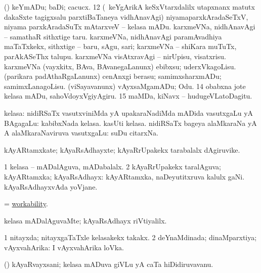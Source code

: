  (\AmA) keYmADu; baDi; cacucx. 
\eanum
\numie
\num{12}  (\kanmu\ keYgArikA keSxVtarxdalilx utapxnanx matutx dakaSxte tagigxsalu parxtiBaTaneya vidhAnavAgi) niyamaparxkAradaSeTxV, niyama parxkAradaSuTx mAtarxveV -- kelasa mADu. 
  
\banum
{} karxmeVNa, nidhAnavAgi -- samathaR sithxtige taru. 
 karxmeVNa, nidhAnavAgi paramAvadhiya maTaTxkekx, sithxtige -- baru, sAgu, sari; karxmeVNa -- shiKara muTuTx, parAkASeThx talupu. 
 karxmeVNa visAtxravAgi -- nirUpisu, visatxrisu. 
 karxmeVNa (vayxkitx, BAva, BAvanegaLanunx) ebibxsu; uderxVkagoLisu. 
 (parikara padAthaRgaLanunx) cenAnxgi berasu; samimxsharxmADu; samimxLanagoLisu. 
 (viSayavanunx) vAyxsaMgamADu; Odu. 
\eanum
\numie
\num{14}  obabxna jote kelasa mADu, sahoVdoyxVgiyAgiru. 
\num{15}  maMDa, kiNavx -- hudugeVLatoDagitu. 
\enum
\emng
\eentry

\bentry
{}
\gl{\saupa}
\expl{}
\bmng
kelasa: 
\banum
{} nidiRSaTx vasutxviniMda yA upakaraNadiMda mADida vasutxgaLu yA BAgagaLu:  kabibxNada kelasa.  kasUti kelasa. 
 nidiRSaTx bageya alaMkaraNa yA A alaMkaraNaviruva vasutxgaLu:  suDu citarxNa. 
\eanum
\emng
\eentry

\bentry
{} 
\gl{\nA}
\bmng
kAyARtamxkate; kAyaRsAdhayxte; kAyaRrUpakekx tarabalalx dAgiruvike. 
\emng
\eentry

\bentry
{} 
\gl{\gu}
\expl{}
\bmng
\bnum
\num{1} kelasa -- mADalAguva, mADabalalx. 
\num{2} kAyaRrUpakekx taralAguva; kAyARtamxka; kAyaRsAdhayx:  kAyARtamxka, naDeyutitxruva kalulx gaNi.  kAyaRsAdhayxvAda yoVjane. 
\enum
\emng
\eentry

\bentry
{} 
\gl{\nA}
\expl{}
\bmng
= \hyperlink{workability}{workability}. 
\emng
\eentry

\bentry
{} 
\gl{\kirxvi}
\expl{}
\bmng
kelasa mADalAguvaMte; kAyaRsAdhayx riVtiyalilx. 
\emng
\eentry

\bentry
{} 
\gl{\gu}
\expl{}
\bmng
\bnum
\num{1} nitayxda; nitayxgaTaTxle kelasakekx takakx. 
\num{2} deYnaMdinada; dinaMparxtiya; vAyxvahArika:  I vAyxvahArika loVka. 
\enum
\emng
\eentry

\bentry
{} 
\gl{\nA}
\expl{}
\bmng
(\AmA) kAyaRvayxsani; kelasa mADuva giVLu yA caTa hiDidiruvavanu. 
\emng
\eentry

